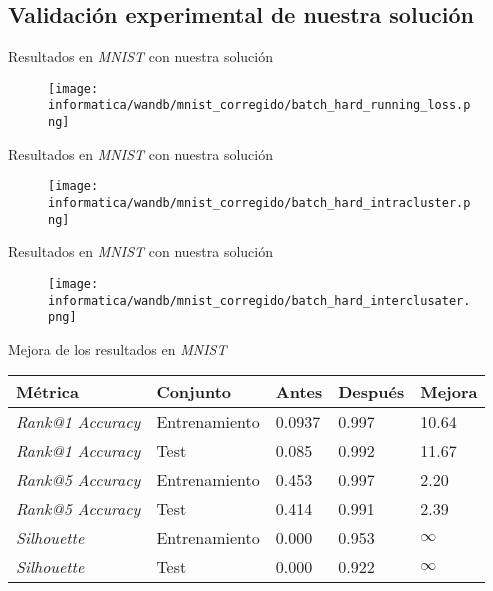 \subsection{Validación experimental de nuestra solución}
\begin{frame}{Resultados en \textit{MNIST} con nuestra solución}

	\begin{figure}
		\texttt{[image: informatica/wandb/mnist\_corregido/batch\_hard\_running\_loss.png]}
	\end{figure}
\end{frame}

\begin{frame}{Resultados en \textit{MNIST} con nuestra solución}

	\begin{figure}
		\texttt{[image: informatica/wandb/mnist\_corregido/batch\_hard\_intracluster.png]}
	\end{figure}

\end{frame}

\begin{frame}{Resultados en \textit{MNIST} con nuestra solución}


	\begin{figure}
		\texttt{[image: informatica/wandb/mnist\_corregido/batch\_hard\_interclusater.png]}
	\end{figure}


\end{frame}

\begin{frame}{Mejora de los resultados en \textit{MNIST}}


	\begin{table}
		\centering
		\begin{tabular}{|l|l|l|l|l|}
			\hline
			Métrica                  & Conjunto      & Antes  & Después & Mejora   \\
			\hline
			\textit{Rank@1 Accuracy} & Entrenamiento & 0.0937 & 0.997   & 10.64    \\
			\textit{Rank@1 Accuracy} & Test          & 0.085  & 0.992   & 11.67    \\
			\textit{Rank@5 Accuracy} & Entrenamiento & 0.453  & 0.997   & 2.20     \\
			\textit{Rank@5 Accuracy} & Test          & 0.414  & 0.991   & 2.39     \\
			\textit{Silhouette}      & Entrenamiento & 0.000  & 0.953   & $\infty$ \\
			\textit{Silhouette}      & Test          & 0.000  & 0.922   & $\infty$ \\
			\hline
		\end{tabular}
		\label{table:comparaciones_mnist_resultados}
	\end{table}
\end{frame}


